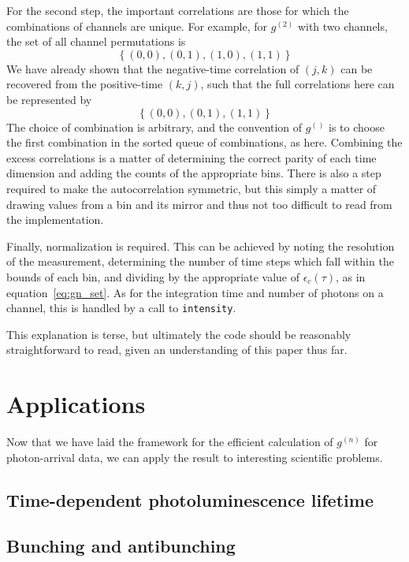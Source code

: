 \documentclass{article}
\newcommand{\braces}[1]{\ensuremath{\left\lbrace #1 \right\rbrace}}
\newcommand{\gn}[1]{\ensuremath{g^{(#1)}}}
\newcommand{\resolution}{\ensuremath{\epsilon}}
\begin{document}
For the second step, the important correlations are those for which the combinations of channels are unique. For example, for \gn{2} with two channels, the set of all channel permutations is
\begin{equation}
\braces{(0,0),(0,1),(1,0),(1,1)}
\end{equation}
We have already shown that the negative-time correlation of $(j,k)$ can be recovered from the positive-time $(k,j)$, such that the full correlations here can be represented by
\begin{equation}
\braces{(0,0),(0,1),(1,1)}
\end{equation}
The choice of combination is arbitrary, and the convention of \gn{} is to choose the first combination in the sorted queue of combinations, as here. Combining the excess correlations is a matter of determining the correct parity of each time dimension and adding the counts of the appropriate bins. There is also a step required to make the autocorrelation symmetric, but this simply a matter of drawing values from a bin and its mirror and thus not too difficult to read from the implementation.

Finally, normalization is required. This can be achieved by noting the resolution of the measurement,  determining the number of time steps which fall within the bounds of each bin, and dividing by the appropriate value of $\resolution_{c}(\tau)$, as in equation~\ref{eq:gn_set}. As for the integration time and number of photons on a channel, this is handled by a call to \texttt{intensity}.

This explanation is terse, but ultimately the code should be reasonably straightforward to read, given an understanding of this paper thus far.

\section{Applications}
Now that we have laid the framework for the efficient calculation of \gn{n} for photon-arrival data, we can apply the result to interesting scientific problems.

\subsection{Time-dependent photoluminescence lifetime}
\subsection{Bunching and antibunching}
\end{document}
